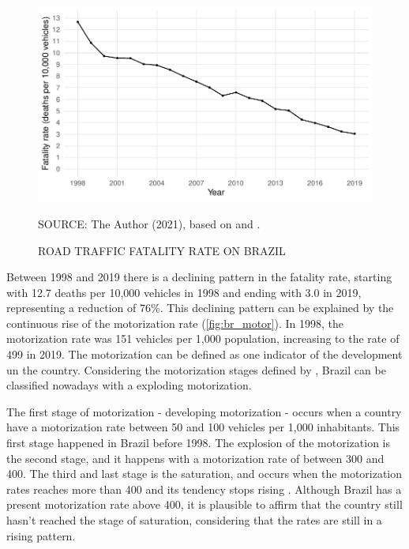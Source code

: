 \begin{figure}[!htbp]
    \centering\footnotesize
    \captionsetup{font=footnotesize}
    \caption{ROAD TRAFFIC FATALITY RATE ON BRAZIL}
    \includegraphics{fig/brazil_fatality.pdf}
    \label{fig:br_fatal}
    \par SOURCE: The Author (2021), based on \textcite{MinistryofHealth2020} and \textcite{DENATRAN2020}.
\end{figure}                                

Between 1998 and 2019 there is a declining pattern in the fatality rate, starting with 12.7 deaths per 10,000 vehicles in 1998 and ending with 3.0 in 2019, representing a reduction of 76\%. This declining pattern can be explained by the continuous rise of the motorization rate (\autoref{fig:br_motor}). In 1998, the motorization rate was 151 vehicles per 1,000 population, increasing to the rate of 499 in 2019. The motorization can be defined as one indicator of the development un the country. Considering the motorization stages defined by \textcite{Jorgensen2005}, Brazil can be classified nowadays with a exploding motorization. 

The first stage of motorization - developing motorization - occurs when a country have a motorization rate between 50 and 100 vehicles per 1,000 inhabitants. This first stage happened in Brazil before 1998. The explosion of the motorization is the second stage, and it happens with a motorization rate of between 300 and 400. The third and last stage is the saturation, and occurs when the motorization rates reaches more than 400 and its tendency stops rising \cite{Jorgensen2005}. Although Brazil has a present motorization rate above 400, it is plausible to affirm that the country still hasn't reached the stage of saturation, considering that the rates are still in a rising pattern. 

